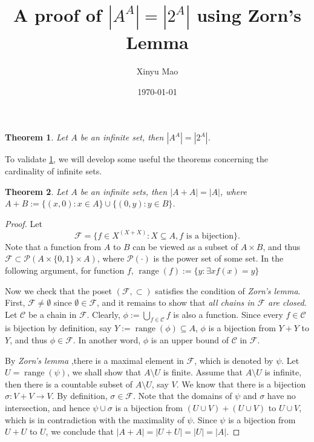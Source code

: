 \documentclass[12pt]{article}
\title{A proof of $|A^A| = |2^A| $ using Zorn's Lemma}
\author{Xinyu Mao}
\date{\today}
\theoremstyle{mythm}
\newtheorem{theorem}{Theorem}
\newcommand\cc{\mathcal{C}}
\newcommand\pp{\mathcal{P}}
\newcommand\ff{\mathcal{F}}
\DeclareMathOperator{\range}{range}
\begin{document}
\maketitle

\begin{tcolorbox}
\begin{theorem} \label{main}
    Let $A$ be an infinite set, then $|A^A| = |2^A|$.
\end{theorem}
\end{tcolorbox}
To validate \cref{main}, we will develop some useful the theorems concerning 
the cardinality of infinite sets.

\begin{theorem} \label{helper1}
    Let $A$ be an infinite sets, then $|A + A| = |A|$,
    where $A + B := \{(x,0):x \in A\} \cup \{(0,y) : y \in B\}$.
\end{theorem}  

\begin{proof}
    Let 
    $$
    \ff = \{f \in X^{(X + X)} : X \subseteq A, f \text{ is a bijection}\}.
    $$
    Note that a function from $A$ to $B$ can be viewed as 
    a subset of $A \times B$, and thus $\ff \subset \pp(A \times \{0,1\}\times A)$,
    where $\pp(\cdot)$ is the power set of some set. 
    In the following argument, for function $f$, $\range(f) := \{y:\exists x f(x) = y\}$
    
    Now we check that the poset $(\ff, \subset)$ satisfies
    the condition of \textit{Zorn's lemma}. 
    First, $\ff \neq \emptyset$ since $\emptyset \in \ff$,
    and it remains to show that \textit{all chains in $\ff$ are closed}.
    Let $\cc$ be a chain in $\ff$. 
    Clearly, $\phi := \bigcup_{f \in \cc} f$ is also a
    function. Since every $f \in \cc$ is bijection by definition, 
    say $Y := \range(\phi) \subseteq A$, $\phi$ is a bijection from $Y + Y$ to $Y$,
    and thus $\phi \in \ff$.
    In another word, $\phi$ is an upper bound of $\cc$ in $\ff$. 

    By \textit{Zorn's lemma} ,there is a maximal element in $\ff$,
    which is denoted by $\psi$. Let $U = \range(\psi)$, we shall
    show that $A\setminus U$ is finite. Assume that $A\setminus U$
    is infinite, then there is a countable subset of $A\setminus U$,
    say $V$. We know that there is a bijection $\sigma : V + V \to V$.
    By definition, $\sigma \in \ff$. 
    Note that the domains of $\psi$ and $\sigma$ have no intersection, 
    and hence $\psi \cup \sigma$ is a bijection from $(U \cup V) + (U \cup V)$ to $U \cup V$, 
    which is in contradiction with the maximality of $\psi$.
    Since $\psi$ is a bijection from $U + U $ to $U$,
    we conclude that $|A + A| = |U + U| = |U| = |A|$.
\end{proof}     
\end{document}
